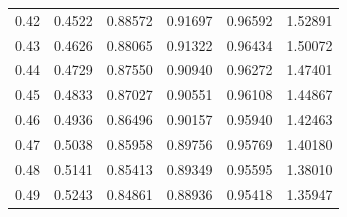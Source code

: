 \begin{minipage}{0.48\textwidth}
\begin{tabular}{c|c|c|c|c|c}
        0.42 & 0.4522 & 0.88572 & 0.91697 & 0.96592 & 1.52891 \\
        0.43 & 0.4626 & 0.88065 & 0.91322 & 0.96434 & 1.50072 \\
        0.44 & 0.4729 & 0.87550 & 0.90940 & 0.96272 & 1.47401 \\
        0.45 & 0.4833 & 0.87027 & 0.90551 & 0.96108 & 1.44867 \\
        0.46 & 0.4936 & 0.86496 & 0.90157 & 0.95940 & 1.42463 \\
        0.47 & 0.5038 & 0.85958 & 0.89756 & 0.95769 & 1.40180 \\
        0.48 & 0.5141 & 0.85413 & 0.89349 & 0.95595 & 1.38010 \\
        0.49 & 0.5243 & 0.84861 & 0.88936 & 0.95418 & 1.35947 \\
    \end{tabular}
\end{minipage}%
\vline
